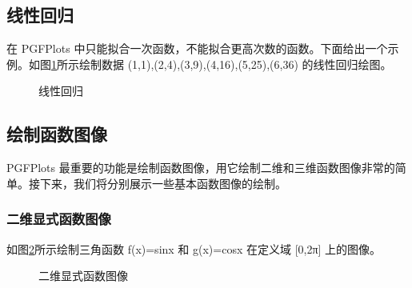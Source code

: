 \subsection{ 线性回归}

在 PGFPlots 中只能拟合一次函数，不能拟合更高次数的函数。下面给出一个示例。如图\ref{fig:regression}所示绘制数据 {(1,1),(2,4),(3,9),(4,16),(5,25),(6,36)} 的线性回归绘图。

\begin{figure}[htb]
	\centering
	\caption{线性回归}
	\label{fig:regression}
\end{figure}

\subsection{绘制函数图像}
PGFPlots 最重要的功能是绘制函数图像，用它绘制二维和三维函数图像非常的简单。接下来，我们将分别展示一些基本函数图像的绘制。
~\\
\subsubsection{二维显式函数图像}
如图\ref{fig:two}所示绘制三角函数 f(x)=sinx 和 g(x)=cosx 在定义域 [0,2π] 上的图像。

\begin{figure}[htb]
	\centering
	\caption{二维显式函数图像}
	\label{fig:two}
\end{figure}

